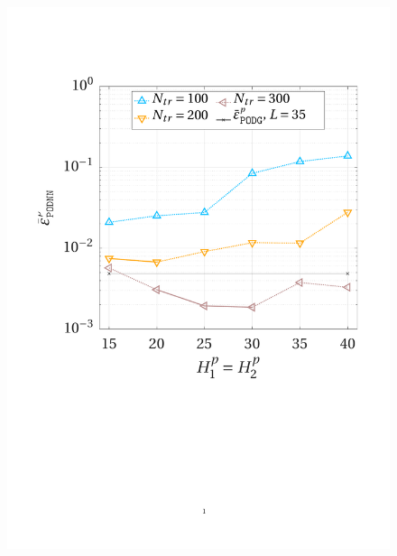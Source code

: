 \documentclass[longtitle]{elsarticle}
\numberwithin{equation}{section}
\theoremstyle{theorem}
\theoremstyle{definition}
\theoremstyle{remark}
\theoremstyle{proposition}
\numberwithin{figure}{section}
\begin{document}
\begin{figure}[h!]
			\includegraphics[scale = 0.37, trim = {1cm 9cm 1.5cm 3.5cm}, clip]{dc_200_p_nn_convergence}
			\hspace*{1cm}

\end{figure}
\end{document}

